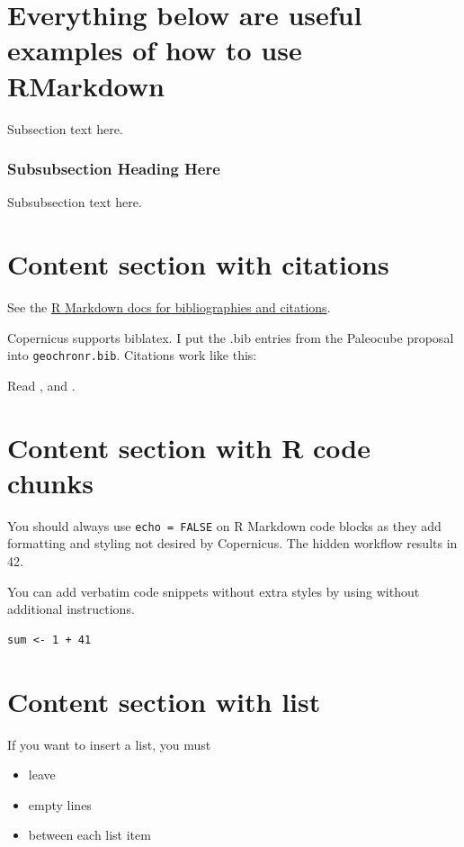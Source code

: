 \documentclass[gc, manuscript]{copernicus}
\begin{document}
\section{Everything below are useful examples of how to use RMarkdown}

Subsection text here.

\subsubsection{Subsubsection Heading Here}

Subsubsection text here.

\section{Content section with citations}

See the
\href{http://rmarkdown.rstudio.com/authoring_bibliographies_and_citations.html}{R
Markdown docs for bibliographies and citations}.

Copernicus supports biblatex. I put the .bib entries from the Paleocube
proposal into \texttt{geochronr.bib}. Citations work like this:

Read \citep{Evans_QSR13}, and \citep[see][]{PRYSM}.

\section{Content section with R code chunks}

You should always use \texttt{echo\ =\ FALSE} on R Markdown code blocks
as they add formatting and styling not desired by Copernicus. The hidden
workflow results in 42.

You can add verbatim code snippets without extra styles by using
\texttt{\textasciigrave{}\textasciigrave{}\textasciigrave{}} without
additional instructions.

\begin{verbatim}
sum <- 1 + 41
\end{verbatim}

\section{Content section with list}

If you want to insert a list, you must

\begin{itemize}
\item
  leave
\item
  empty lines
\item
  between each list item
\end{itemize}
\end{document}
